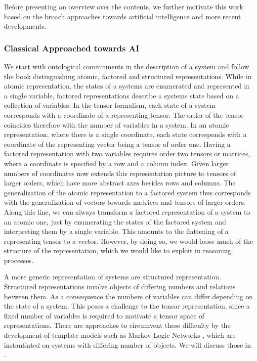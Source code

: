 Before presenting an overview over the contents, we further motivate this work based on the broach approaches towards artificial intelligence and more recent developments.

\subsubsection{Classical Approached towards AI}

We start with ontological commitments in the description of a system and follow the book \cite{russell_artificial_2021} distinguishing atomic, factored and structured representations.
While in atomic representation, the states of a systems are enumerated and represented in a single variable, factored representations describe a systems state based on a collection of variables.
In the tensor formalism, each state of a system corresponds with a coordinate of a representing tensor.
The order of the tensor coincides therefore with the number of variables in a system.
In an atomic representation, where there is a single coordinate, each state corresponds with a coordinate of the representing vector being a tensor of order one.
Having a factored representation with two variables requires order two tensors or matrices, where a coordinate is specified by a row and a column index.
Given larger numbers of coordinates now extends this representation picture to tensors of larger orders, which have more abstract axes besides rows and columns.
The generalization of the atomic representation to a factored system thus corresponds with the generalization of vectors towards matrices and tensors of larger orders.
Along this line, we can always transform a factored representation of a system to an atomic one, just by enumerating the states of the factored system and interpreting them by a single variable.
This amounts to the flattening of a representing tensor to a vector.
However, by doing so, we would loose much of the structure of the representation, which we would like to exploit in reasoning processes.

A more generic representation of systems are structured representation.
Structured representations involve objects of differing numbers and relations between them.
As a consequence the numbers of variables can differ depending on the state of a system.
This poses a challenge to the tensor representation, since a fixed number of variables is required to motivate a tensor space of representations.
There are approaches to circumvent these difficulty by the development of template models such as Markov Logic Networks \cite{richardson_markov_2006}, which are instantiated on systems with differing number of objects.
We will discuss those in .

